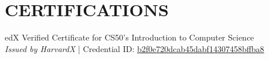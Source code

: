 \documentclass[a4paper,9pt]{extarticle}
\begin{document}
\section*{CERTIFICATIONS}
\noindent
\begin{minipage}{1\textwidth}
\setlength{\parindent}{15pt} %
	\noindent
	edX Verified Certificate for CS50's Introduction to Computer Science \\
	\textit{Issued by HarvardX} | Credential ID: \href{https://courses.edx.org/certificates/b2f0e720dcab45dabf14307458bffba8}{b2f0e720dcab45dabf14307458bffba8} 
\end{minipage}


\end{document}
